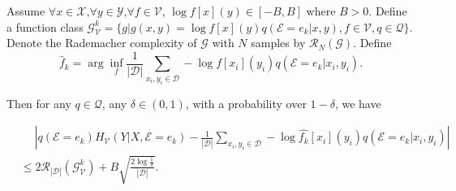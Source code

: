 \begin{lemma}
\label{lemma:err_1}
Assume $\forall x \in \mathcal X$,$\forall y \in \mathcal Y$,$\forall f \in \mathcal V$, $\log f[x](y) \in [-B,B]$ where $B > 0$. Define a function class $\mathcal G_{\mathcal V}^k = \{g|g(x,y) = \log f[x](y)q(\mathcal E=e_k|x,y), f\in \mathcal V, q \in \mathcal Q  \}$. Denote the Rademacher complexity of $\mathcal G$ with $N$ samples by $\mathscr R_{N}(\mathcal G)$. Define 
\begin{equation}
\hat f_k = \arg \inf_f \frac{1}{|\mathcal D|}  \sum_{x_i,y_i \in \mathcal D} -\log f[x_i](y_i) q(\mathcal E=e_k|x_i,y_i).
\end{equation}

Then for any $q \in \mathcal Q$,  any $\delta \in (0,1)$, with a probability over $1 - \delta$,  we have
\begin{small}
\begin{align}
    &\quad\; \left|q(\mathcal E=e_k)H_{\mathcal V}(Y|X,\mathcal E=e_k)  - \frac{1}{|\mathcal D|} \sum_{x_i,y_i \in \mathcal D} -\log \hat{f_k}[x_i](y_i) q(\mathcal E=e_k|x_i,y_i) \right| \\
    &\leq 2\mathscr R_{|\mathcal D|}(\mathcal G_{\mathcal V}^k) + B\sqrt{\frac{2\log{\frac{1}{\delta}}}{|\mathcal D|}}.
\end{align}
\end{small}
\end{lemma}
